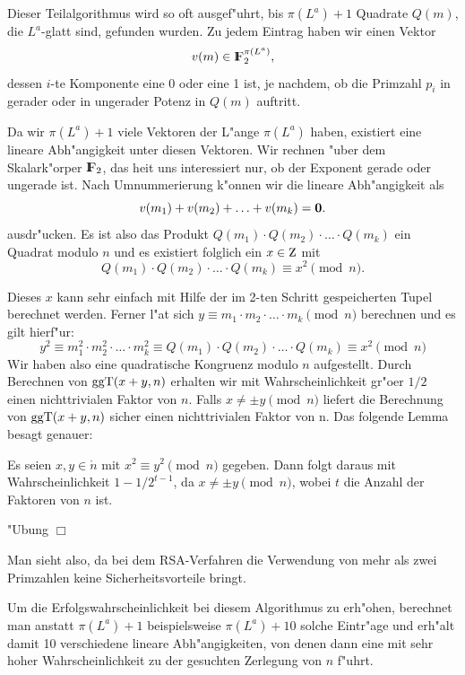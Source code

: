 Dieser Teilalgorithmus wird so oft ausgef"uhrt, bis $\pi(L^a)+1$
Quadrate $Q(m)$, die $L^a$-glatt sind, gefunden wurden. Zu jedem
Eintrag haben wir einen Vektor
$$ v(m) \in\koerper{2}^{\pi(L^a)}, $$
dessen $i$-te Komponente eine 0 oder eine 1 ist, je nachdem, ob die
Primzahl $p_i$ in gerader oder in ungerader Potenz in $Q(m)$
auftritt.

Da wir $\pi(L^a)+1$ viele Vektoren der L"ange $\pi(L^a)$ haben,
existiert eine lineare Abh"angigkeit unter diesen Vektoren. Wir
rechnen "uber dem Skalark"orper $\koerper{2}$, das hei\3t uns
interessiert nur, ob der Exponent gerade oder ungerade ist. Nach
Umnummerierung k"onnen wir die lineare Abh"angigkeit als
$$ v(m_1)+v(m_2)+\ldots +v(m_k) = {\bf 0} .$$
ausdr"ucken. Es ist also das Produkt $Q(m_1) \cdot Q(m_2) \cdot \ldots
\cdot Q(m_k)$ ein Quadrat modulo $n$ und es
existiert folglich ein $x\in\Z$ mit
$$ Q(m_1) \cdot Q(m_2) \cdot \ldots \cdot Q(m_k) \equiv x^2 \pmod{n}. $$

Dieses $x$ kann sehr einfach mit Hilfe der im 2-ten Schritt
gespeicherten Tupel berechnet werden.  Ferner l"a\3t sich $y\equiv m_1
\cdot m_2 \cdot \ldots \cdot m_k \pmod{n}$ berechnen und es gilt
hierf"ur:
$$ y^2 \equiv m_1^2 \cdot m_2^2 \cdot \ldots \cdot m_k^2 \equiv Q(m_1) 
   \cdot Q(m_2) \cdot \ldots \cdot Q(m_k) \equiv x^2 \pmod{n} $$
Wir haben also eine quadratische Kongruenz modulo $n$
aufgestellt. Durch Berechnen von $\mbox{ggT}(x+y,n)$ erhalten wir mit
Wahrscheinlichkeit gr"o\3er $1/2$ einen nichttrivialen Faktor von $n$.
Falls $x \neq \pm y \pmod{n}$ liefert die Berechnung von $\mbox{ggT}(x+y,n)$
sicher einen nichttrivialen Faktor von n. Das folgende Lemma besagt
genauer:

\begin{lemma} 
  Es seien $x,y\in\ring{n}$ mit $x^2 \equiv y^2 \pmod{n}$
  gegeben. Dann folgt daraus mit Wahrscheinlichkeit $1-1/2^{t-1}$,
  da\3 $x \ne \pm y \pmod{n}$, wobei $t$ die Anzahl der Faktoren von
  $n$ ist.
\end{lemma}

\beweis 
"Ubung \hfill $\Box$

\begin{bem}
  Man sieht also, da\3 bei dem RSA-Verfahren die Verwendung von mehr
  als zwei Primzahlen keine Sicherheitsvorteile bringt.
\end{bem}

Um die Erfolgswahrscheinlichkeit bei diesem Algorithmus zu erh"ohen,
berechnet man anstatt $\pi(L^a)+1$ beispielsweise $\pi(L^a)+10$ solche
Eintr"age und erh"alt damit 10 verschiedene lineare Abh"angigkeiten,
von denen dann eine mit sehr hoher Wahrscheinlichkeit zu der gesuchten
Zerlegung von $n$ f"uhrt.

